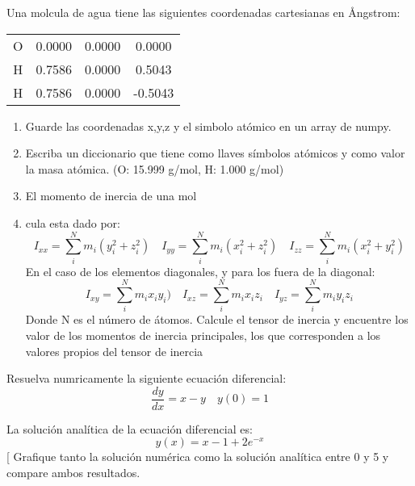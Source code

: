 \documentclass[5pt]{exam}
\begin{document}
{\begin{questions}
\item Una molcula de agua tiene las siguientes coordenadas cartesianas en \AA ngstrom: 
    \begin{table}[h!]
        \centering
        \begin{tabular}{c|ccc}
            O & 0.0000 & 0.0000 & 0.0000 \\
            H & 0.7586 & 0.0000 & 0.5043 \\
            H & 0.7586 & 0.0000 & -0.5043
        \end{tabular}
    \end{table}
    \begin{enumerate}
        \item Guarde las coordenadas x,y,z y el simbolo atómico en un array de numpy.
        \item Escriba un diccionario que tiene como llaves símbolos atómicos y como valor la masa
              atómica. (O: 15.999 g/mol, H: 1.000 g/mol)
        \item El momento de inercia de una mol\item cula esta dado por:
            \begin{equation}
                I_{xx} = \sum_i^N m_i(y_i^2 + z_i^2) \quad I_{yy} = \sum_i^N m_i(x_i^2 + z_i^2) \quad I_{zz} = \sum_i^N m_i(x_i^2 + y_i^2)
            \end{equation}
        En el caso de los elementos diagonales, y para los fuera de la diagonal:
            \begin{equation}
                I_{xy} = \sum_i^N m_ix_iy_i) \quad I_{xz} = \sum_i^N m_ix_iz_i \quad I_{yz}=\sum_i^N m_iy_iz_i
            \end{equation}
        Donde N es el número de átomos. Calcule el tensor de inercia y encuentre los valor de los
        momentos de inercia principales, los que corresponden a los valores propios del tensor de
        inercia
    \end{enumerate}


\item Resuelva numricamente la siguiente ecuación diferencial:
    \begin{equation}
        \frac{dy}{dx} = x -y \quad y(0) = 1 
    \end{equation}

La solución analítica de la ecuación diferencial es:
\begin{equation}
    y(x) = x -1 +2e^{-x}
\end{equation}[
Grafique tanto la solución num\'erica como la solución analítica entre 0 y 5 y compare ambos
resultados.


\end{questions}}
\end{document}
